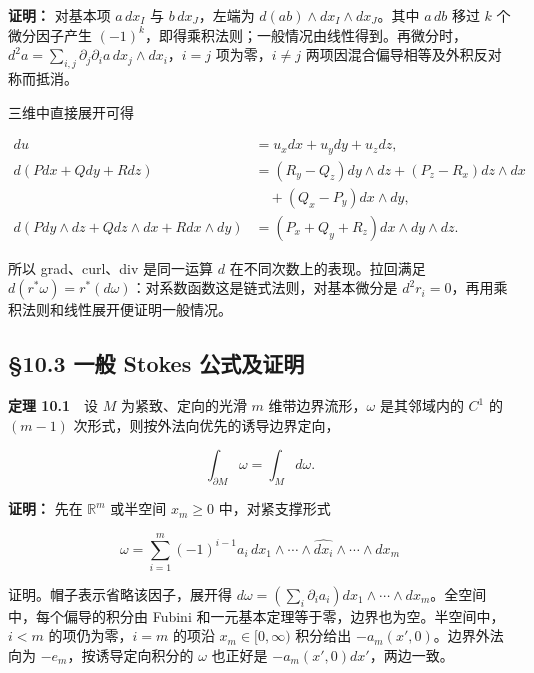 \documentclass[11pt,a4paper]{article}
\begin{document}
\textbf{证明：} 对基本项 \(a\,dx_I\) 与 \(b\,dx_J\)，左端为
\(d(ab)\wedge dx_I\wedge dx_J\)。其中 \(a\,db\) 移过 \(k\)
个微分因子产生
\((-1)^k\)，即得乘积法则；一般情况由线性得到。再微分时，\(d^2a=\sum_{i,j}\partial_j\partial_i a\,dx_j\wedge dx_i\)，\(i=j\)
项为零，\(i\ne j\) 两项因混合偏导相等及外积反对称而抵消。

三维中直接展开可得

\begin{equation*}
\begin{aligned}
 du&=u_xdx+u_ydy+u_zdz,\\
 d(Pdx+Qdy+Rdz)
 &=(R_y-Q_z)dy\wedge dz+(P_z-R_x)dz\wedge dx\\
 &\quad +(Q_x-P_y)dx\wedge dy,\\
 d(Pdy\wedge dz+Qdz\wedge dx+Rdx\wedge dy)
 &=(P_x+Q_y+R_z)dx\wedge dy\wedge dz.
\end{aligned}\tag{10.3}
\end{equation*}

所以 grad、curl、div 是同一运算 \(d\) 在不同次数上的表现。拉回满足
\(d(r^*\omega)=r^*(d\omega)\)：对系数函数这是链式法则，对基本微分是
\(d^2r_i=0\)，再用乘积法则和线性展开便证明一般情况。

\subsection{§10.3 一般 Stokes
公式及证明}\label{ux4e00ux822c-stokes-ux516cux5f0fux53caux8bc1ux660e}

\textbf{定理 10.1}　设 \(M\) 为紧致、定向的光滑 \(m\)
维带边界流形，\(\omega\) 是其邻域内的 \(C^1\) 的 \((m-1)\)
次形式，则按外法向优先的诱导边界定向，

\begin{equation*}
 \int_{\partial M}\omega=\int_Md\omega.\tag{10.4}
\end{equation*}

\textbf{证明：} 先在 \(\mathbb R^m\) 或半空间 \(x_m\ge0\)
中，对紧支撑形式

\begin{equation*}
 \omega=\sum_{i=1}^m(-1)^{i-1}a_i\,
 dx_1\wedge\cdots\wedge\widehat{dx_i}\wedge\cdots\wedge dx_m
\end{equation*}

证明。帽子表示省略该因子，展开得
\(d\omega=(\sum_i\partial_i a_i)dx_1\wedge\cdots\wedge dx_m\)。全空间中，每个偏导的积分由
Fubini 和一元基本定理等于零，边界也为空。半空间中，\(i<m\)
的项仍为零，\(i=m\) 的项沿 \(x_m\in[0,\infty)\) 积分给出
\(-a_m(x',0)\)。边界外法向为 \(-e_m\)，按诱导定向积分的 \(\omega\)
也正好是 \(-a_m(x',0)dx'\)，两边一致。
\end{document}
